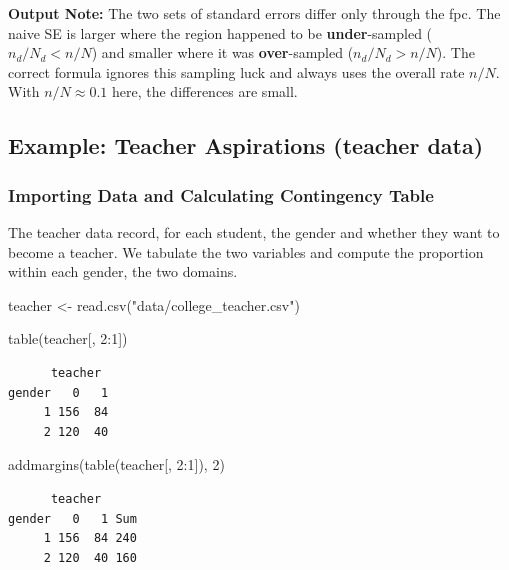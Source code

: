 \documentclass[
  letterpaper,
  DIV=11,
  numbers=noendperiod]{scrreprt}
\newenvironment{Shaded}{\begin{snugshade}}{\end{snugshade}}
\newcommand{\DecValTok}[1]{\textcolor[rgb]{0.68,0.00,0.00}{#1}}
\newcommand{\FunctionTok}[1]{\textcolor[rgb]{0.28,0.35,0.67}{#1}}
\newcommand{\NormalTok}[1]{\textcolor[rgb]{0.00,0.23,0.31}{#1}}
\newcommand{\OtherTok}[1]{\textcolor[rgb]{0.00,0.23,0.31}{#1}}
\newcommand{\SpecialCharTok}[1]{\textcolor[rgb]{0.37,0.37,0.37}{#1}}
\newcommand{\StringTok}[1]{\textcolor[rgb]{0.13,0.47,0.30}{#1}}
\renewcommand{\[}{\begin{equation}}
\renewcommand{\]}{\end{equation}}
\begin{document}
\textbf{Output Note:} The two sets of standard errors differ only
through the fpc. The naive SE is larger where the region happened to be
\textbf{under}-sampled (\(n_d/N_d < n/N\)) and smaller where it was
\textbf{over}-sampled (\(n_d/N_d > n/N\)). The correct formula ignores
this sampling luck and always uses the overall rate \(n/N\). With
\(n/N \approx 0.1\) here, the differences are small.

\subsection{Example: Teacher Aspirations (teacher
data)}\label{example-teacher-aspirations-teacher-data}

\subsubsection{Importing Data and Calculating Contingency
Table}\label{importing-data-and-calculating-contingency-table}

The teacher data record, for each student, the gender and whether they
want to become a teacher. We tabulate the two variables and compute the
proportion within each gender, the two domains.

\begin{Shaded}
\begin{Highlighting}[]
\NormalTok{teacher }\OtherTok{\textless{}{-}} \FunctionTok{read.csv}\NormalTok{(}\StringTok{"data/college\_teacher.csv"}\NormalTok{)}

\FunctionTok{table}\NormalTok{(teacher[, }\DecValTok{2}\SpecialCharTok{:}\DecValTok{1}\NormalTok{])}
\end{Highlighting}
\end{Shaded}

\begin{verbatim}
      teacher
gender   0   1
     1 156  84
     2 120  40
\end{verbatim}

\begin{Shaded}
\begin{Highlighting}[]
\FunctionTok{addmargins}\NormalTok{(}\FunctionTok{table}\NormalTok{(teacher[, }\DecValTok{2}\SpecialCharTok{:}\DecValTok{1}\NormalTok{]), }\DecValTok{2}\NormalTok{)}
\end{Highlighting}
\end{Shaded}

\begin{verbatim}
      teacher
gender   0   1 Sum
     1 156  84 240
     2 120  40 160
\end{verbatim}
\end{document}
